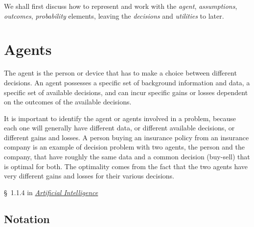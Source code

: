 \documentclass[
  a4paper,
  DIV=11,
  numbers=noendperiod,
  oneside]{scrreprt}
\begin{document}
We shall first discuss how to represent and work with the \emph{agent},
\emph{assumptions}, \emph{outcomes}, \emph{probability} elements,
leaving the \emph{decisions} and \emph{utilities} to later.

\hypertarget{agents}{%
\section{Agents}\label{agents}}

The agent is the person or device that has to make a choice between
different decisions. An agent possesses a specific set of background
information and data, a specific set of available decisions, and can
incur specific gains or losses dependent on the outcomes of the
available decisions.


It is important to identify the agent or agents involved in a problem,
because each one will generally have different data, or different
available decisions, or different gains and losses. A person buying an
insurance policy from an insurance company is an example of decision
problem with two agents, the person and the company, that have roughly
the same data and a common decision (buy-sell) that is optimal for both.
The optimality comes from the fact that the two agents have very
different gains and losses for their various decisions.

\begin{tcolorbox}[enhanced jigsaw, arc=.35mm, colback=white, bottomrule=.15mm, bottomtitle=1mm, breakable, opacityback=0, toptitle=1mm, toprule=.15mm, rightrule=.15mm, colframe=quarto-callout-caution-color-frame, leftrule=.75mm, left=2mm, opacitybacktitle=0.6, titlerule=0mm, colbacktitle=quarto-callout-caution-color!10!white, title={\faIcon{book-open} Reading}, coltitle=black]

§~1.1.4 in
\href{https://hvl.instructure.com/courses/25074/modules/items/660089}{\emph{Artificial
Intelligence}}

\end{tcolorbox}

\hypertarget{notation}{%
\subsection{Notation}\label{notation}}
\end{document}

